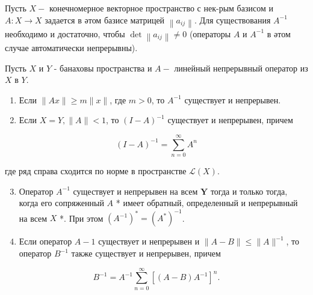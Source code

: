 \documentclass[10pt]{article}
\begin{document}
Пусть $X-$ конечномерное векторное пространство с нек-рым базисом и $A: X \rightarrow X$ задается в әтом базисе матрицей $\left\|a_{i j}\right\|$. Для существования $A^{-1}$ необходимо и достаточно, чтобы $\operatorname{det}\left\|a_{i j}\right\| \neq 0$ (операторы $A$ и $A^{-1}$ в әтом случае автоматически непрерывны).



Пусть $X$ и $Y$ - банаховы пространства и $A-$ линейный непрерывный оператор из $X$ в $Y$.



\begin{enumerate}

  \item Если $\|A x\| \geqslant m\|x\|$, где $m>0$, то $A^{-1}$ существует и непрерывен.



  \item Если $X=Y,\|A\|<1$, то $(I-A)^{-1}$ существует и непрерывен, причем



\end{enumerate}



\[

(I-A)^{-1}=\sum_{n=0}^{\infty} A^{n}

\]



где ряд справа сходится по норме в пространстве $\mathscr{L}(X)$.



\begin{enumerate}

  \setcounter{enumi}{2}

  \item Оператор $A^{-1}$ существует и непрерывен на всем $\boldsymbol{Y}$ тогда и только тогда, когда его сопряженный $A$ * имеет обратный, определенный и непрерывный на всем $X$ *. При этом $\left(A^{-1}\right)^{*}=\left(A^{*}\right)^{-1}$.



  \item Если оператор $A-1$ существует и непрерывен и $\|A-B\| \leqslant\|A\|^{-1}$, то оператор $B^{-1}$ также существует и непрерывен, причем



\end{enumerate}



\[

B^{-1}=A^{-1} \sum_{n=0}^{\infty}\left[(A-B) A^{-1}\right]^{n} .

\]
\end{document}
